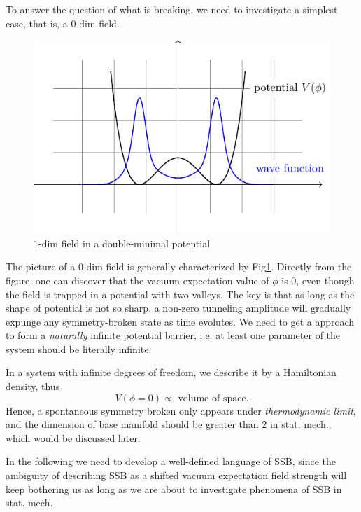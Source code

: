 To answer the question of what is breaking, we need to investigate a simplest case, that is, a $0$-dim field. 
\begin{figure}[hp]
    \centering
    \includegraphics{figures/double_minimum_potential.pdf}
    \caption{$1$-dim field in a double-minimal potential}
    \label{1d_double_minimal}
\end{figure}
The picture of a $0$-dim field is generally characterized by Fig\ref{1d_double_minimal}. Directly from the figure, one can discover that the vacuum expectation value of $\phi$ is $0$, even though the field is trapped in a potential with two valleys. The key is that as long as the shape of potential is not so sharp, a non-zero tunneling amplitude will gradually expunge any symmetry-broken state as time evolutes. We need to get a approach to form a \emph{naturally} infinite potential barrier, i.e. at least one parameter of the system should be literally infinite.

In a system with infinite degrees of freedom, we describe it by a Hamiltonian density, thus
\begin{equation}
    V\left( \phi=0 \right) \propto \text{ volume of space}.
\end{equation}
Hence, a spontaneous symmetry broken only appears under \emph{thermodynamic limit}, and the dimension of base manifold should be greater than $2$ in stat. mech., which would be discussed later.

In the following we need to develop a well-defined language of SSB, since the ambiguity of describing SSB as a shifted vacuum expectation field strength will keep bothering us as long as we are about to investigate phenomena of SSB in stat. mech.

